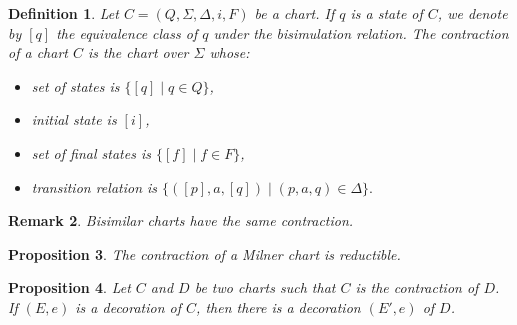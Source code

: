 \documentclass{article}
\newtheorem{definition}{Definition}[section]
\newtheorem{proposition}[definition]{Proposition}
\newtheorem{remark}[definition]{Remark}
\begin{document}
\begin{definition}
    Let $C=(Q,\Sigma,\Delta,i,F)$ be a chart. If $q$ is a state of $C$, we denote by $[q]$ the equivalence class of
     $q$ under the bisimulation relation. 
     The \emph{contraction} of a chart $C$ is the chart over $\Sigma$ whose:
     \begin{itemize}
         \item set of states is $\{ [q] \mid q \in Q \}$,
         \item initial state is $[i]$,
         \item set of final states is $\{ [f] \mid f \in F \}$,
         \item transition relation  is $\{ ([p], a, [q]) \mid (p,a,q) \in \Delta\}.$
     \end{itemize}
    \end{definition}

    \begin{remark}
        Bisimilar charts have the same contraction. ~\label{remark:bisimilar-have-same-contraction}
    \end{remark}

    \begin{proposition}
        The contraction of a Milner chart is reductible. ~\label{prop:contraction-of-Milner-is-reductible}
    \end{proposition}

\begin{proposition}
     Let $C$ and $D$ be two charts such that $C$ is the contraction of $D$.
    If  $(E,e)$ is a decoration of $C$, then there is a decoration $(E', e)$ of $D$. ~\label{prop:expansion-preserves-decorability}
\end{proposition}
\end{document}

